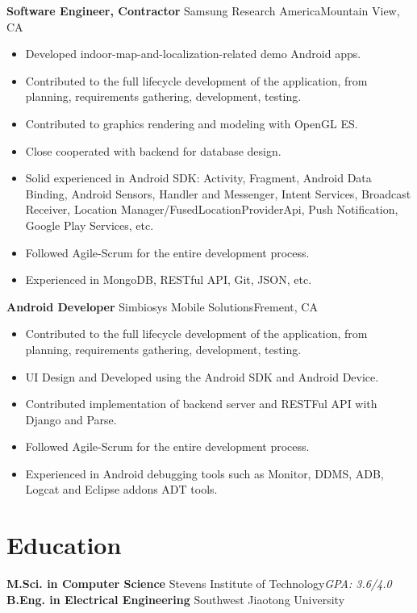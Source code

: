 \documentclass[10pt,letterpaper,sans]{moderncv}        %
\begin{document}
\newpage

\vspace*{0.5cm}
{\textbf{Software Engineer, Contractor}}
{Samsung Research America}{Mountain View, CA}{}{
\begin{itemize}
\item Developed indoor-map-and-localization-related demo Android apps.
\item Contributed to the full lifecycle development of the application, from planning, requirements gathering, development, testing.
\item Contributed to graphics rendering and modeling with OpenGL ES.
\item Close cooperated with backend for database design.
\item Solid experienced in Android SDK: Activity, Fragment, Android Data Binding, Android Sensors, Handler and Messenger, Intent Services, Broadcast Receiver, Location Manager/FusedLocationProviderApi, Push Notification, Google Play Services, etc.
\item Followed Agile-Scrum for the entire development process.
\item Experienced in MongoDB, RESTful API, Git, JSON, etc.
\end{itemize}} 


\vspace*{0.5cm}
{\textbf{Android Developer}}
{Simbiosys Mobile Solutions}{Frement, CA}{}{
\begin{itemize}
\item Contributed to the full lifecycle development of the application, from planning, requirements gathering, development, testing.
\item UI Design and Developed using the Android SDK and Android Device.
\item Contributed implementation of backend server and  RESTFul API  with Django and Parse.
\item Followed Agile-Scrum for the entire development process.
\item Experienced in Android debugging tools such as Monitor, DDMS, ADB, Logcat and Eclipse addons ADT tools.
\end{itemize}} 


\section{Education}
{\textbf{M.Sci. in Computer Science}}
{Stevens Institute of Technology}{}{\textit{GPA: 3.6/4.0}}{}  %
{\textbf{B.Eng. in Electrical Engineering}}
{Southwest Jiaotong University}{}{}{}
\end{document}
